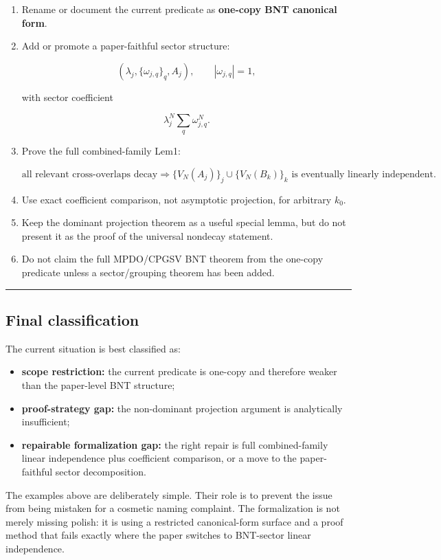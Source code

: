 \documentclass[
  11pt,
]{article}
\providecommand{\tightlist}{%
  \setlength{\itemsep}{0pt}\setlength{\parskip}{0pt}}
\begin{document}
\begin{enumerate}
\def\labelenumi{\arabic{enumi}.}
\item
  Rename or document the current predicate as \textbf{one-copy BNT
  canonical form}.
\item
  Add or promote a paper-faithful sector structure:

  \[
  (\lambda_j,\{\omega_{j,q}\}_q,A_j),
  \qquad |\omega_{j,q}|=1,
  \]

  with sector coefficient

  \[
  \lambda_j^N\sum_q\omega_{j,q}^N.
  \]
\item
  Prove the full combined-family Lem1:

  \[
  \text{all relevant cross-overlaps decay}
  \Longrightarrow
  \{V_N(A_j)\}_j\cup\{V_N(B_k)\}_k
  \text{ is eventually linearly independent}.
  \]
\item
  Use exact coefficient comparison, not asymptotic projection, for
  arbitrary \(k_0\).
\item
  Keep the dominant projection theorem as a useful special lemma, but do
  not present it as the proof of the universal nondecay statement.
\item
  Do not claim the full MPDO/CPGSV BNT theorem from the one-copy
  predicate unless a sector/grouping theorem has been added.
\end{enumerate}

\begin{center}\rule{0.5\linewidth}{0.5pt}\end{center}

\subsection{Final classification}\label{final-classification}

The current situation is best classified as:

\begin{itemize}
\tightlist
\item
  \textbf{scope restriction:} the current predicate is one-copy and
  therefore weaker than the paper-level BNT structure;
\item
  \textbf{proof-strategy gap:} the non-dominant projection argument is
  analytically insufficient;
\item
  \textbf{repairable formalization gap:} the right repair is full
  combined-family linear independence plus coefficient comparison, or a
  move to the paper-faithful sector decomposition.
\end{itemize}

The examples above are deliberately simple. Their role is to prevent the
issue from being mistaken for a cosmetic naming complaint. The
formalization is not merely missing polish: it is using a restricted
canonical-form surface and a proof method that fails exactly where the
paper switches to BNT-sector linear independence.
\end{document}
